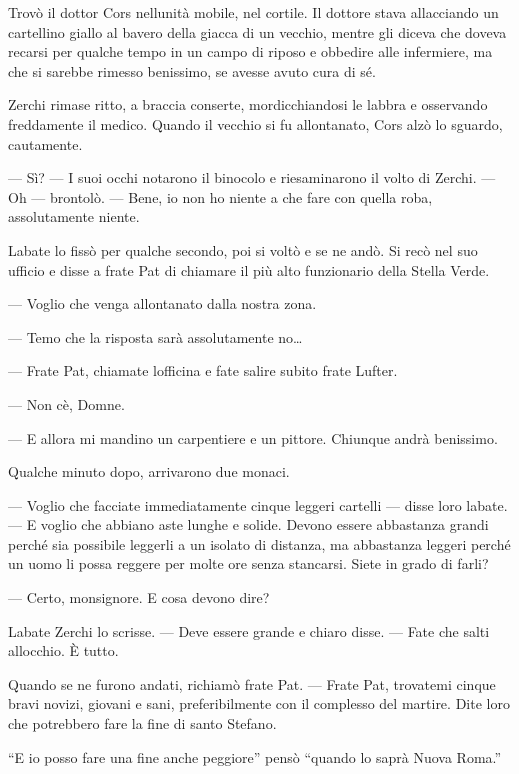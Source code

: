 Trovò il dottor Cors nell\textquotesingle unità mobile, nel cortile. Il
dottore stava allacciando un cartellino giallo al bavero della giacca di
un vecchio, mentre gli diceva che doveva recarsi per qualche tempo in un
campo di riposo e obbedire alle infermiere, ma che si sarebbe rimesso
benissimo, se avesse avuto cura di sé.

Zerchi rimase ritto, a braccia conserte, mordicchiandosi le labbra e
osservando freddamente il medico. Quando il vecchio si fu allontanato,
Cors alzò lo sguardo, cautamente.

--- Sì? --- I suoi occhi notarono il binocolo e riesaminarono il volto
di Zerchi. --- Oh --- brontolò. --- Bene, io non ho niente a che fare
con quella roba, assolutamente niente.

L\textquotesingle abate lo fissò per qualche secondo, poi si voltò e se
ne andò. Si recò nel suo ufficio e disse a frate Pat di chiamare il più
alto funzionario della Stella Verde.

--- Voglio che venga allontanato dalla nostra zona.

--- Temo che la risposta sarà assolutamente no\ldots{}

--- Frate Pat, chiamate l\textquotesingle officina e fate salire subito
frate Lufter.

--- Non c\textquotesingle è, Domne.

--- E allora mi mandino un carpentiere e un pittore. Chiunque andrà
benissimo.

Qualche minuto dopo, arrivarono due monaci.

--- Voglio che facciate immediatamente cinque leggeri cartelli --- disse
loro l\textquotesingle abate. --- E voglio che abbiano aste lunghe e
solide. Devono essere abbastanza grandi perché sia possibile leggerli a
un isolato di distanza, ma abbastanza leggeri perché un uomo li possa
reggere per molte ore senza stancarsi. Siete in grado di farli?

--- Certo, monsignore. E cosa devono dire?

L\textquotesingle abate Zerchi lo scrisse. --- Deve essere grande e
chiaro disse. --- Fate che salti all\textquotesingle occhio. È tutto.

Quando se ne furono andati, richiamò frate Pat. --- Frate Pat, trovatemi
cinque bravi novizi, giovani e sani, preferibilmente con il complesso
del martire. Dite loro che potrebbero fare la fine di santo Stefano.

``E io posso fare una fine anche peggiore'' pensò ``quando lo saprà
Nuova Roma.''
